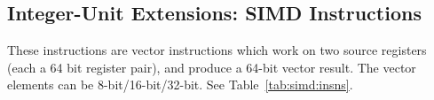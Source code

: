 \documentclass{book}
\begin{document}





\subsection{Integer-Unit Extensions: SIMD Instructions}
\label{sec:integer-unit-extns:simd-instructions}

These instructions  are vector instructions  which work on  two source
registers (each a  64 bit register pair), and produce  a 64-bit vector
result.   The   vector  elements  can  be   8-bit/16-bit/32-bit.   See
Table~\ref{tab:simd:insns}.
\end{document}
